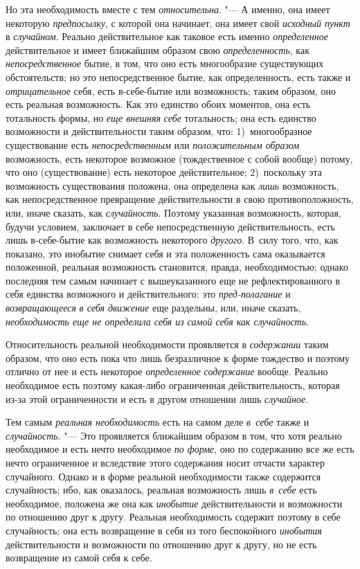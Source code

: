 Но эта необходимость вместе с тем {\em относительна}. "---
А именно, она имеет некоторую {\em предпосылку}, с
которой она начинает, она имеет свой {\em исходный
пункт} в {\em случайном}. Реально действительное как
таковое есть именно {\em определенное} действительное и
имеет ближайшим образом свою {\em определенность}, как
{\em непосредственное} бытие, в том, что оно есть
многообразие существующих обстоятельств; но это непосредственное бытие, как
определенность, есть также и {\em отрицательное} себя,
есть в-себе-бытие или возможность; таким образом, оно есть реальная
возможность. Как это единство обоих моментов, она есть тотальность формы,
но {\em еще внешняя} {\em себе}
тотальность; она есть единство возможности и действительности таким
образом, что: 1)~многообразное существование есть
{\em непосредственным} или
{\em положительным образом} возможность, есть некоторое
возможное (тождественное с собой вообще) потому, что оно (существование)
есть некоторое действительное; 2)~поскольку эта возможность существования
положена, она определена как {\em лишь} возможность,
как непосредственное превращение действительности в свою противоположность,
или, иначе сказать, как {\em случайность}. Поэтому
указанная возможность, которая, будучи условием, заключает в себе
непосредственную действительность, есть лишь в-себе-бытие как возможность
некоторого {\em другого}. В~силу того, что, как
показано, это инобытие снимает себя и эта положенность сама оказывается
положенной, реальная возможность становится, правда, необходимостью; однако
последняя тем самым начинает с вышеуказанного еще не рефлектированного в
себя единства возможного и действительного: это
{\em пред-полагание} и
{\em возвращающееся} {\em в себя
движение} еще раздельны, или, иначе сказать,
{\em необходимость еще не определила себя из самой себя
как случайность}.

Относительность реальной необходимости проявляется в
{\em содержании} таким образом, что оно есть пока что
лишь безразличное к форме тождество и поэтому отлично от нее и есть
некоторое {\em определенное}
{\em содержание} вообще. Реально необходимое есть
поэтому какая-либо ограниченная действительность, которая из-за этой
ограниченности и есть в другом отношении лишь
{\em случайное}.

Тем самым {\em реальная необходимость} есть на самом
деле {\em в~себе} также и
{\em случайность}. "--- Это проявляется ближайшим образом
в том, что хотя реально необходимое и есть нечто необходимое
{\em по форме}, оно по содержанию все же есть нечто
ограниченное и вследствие этого содержания носит отчасти характер
случайного. Однако и в форме реальной необходимости также содержится
случайность; ибо, как оказалось, реальная возможность лишь
{\em в~себе} есть необходимое, положена же она как
{\em инобытие} действительности и возможности по
отношению друг к другу. Реальная необходимость содержит поэтому в себе
случайность; она есть возвращение в себя из того беспокойного
{\em инобытия} действительности и возможности по
отношению друг к другу, но не есть возвращение из самой себя к себе.

